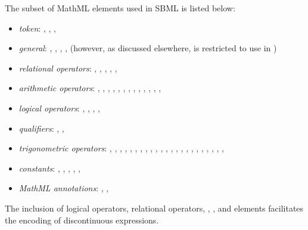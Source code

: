 The subset of MathML elements used in SBML is listed below:
\begin{itemize}\setlength{\parskip}{-0.1ex}

\item \emph{token}: , , ,
  
\item \emph{general}: , ,
  , ,  (however, as
  discussed elsewhere,  is restricted to use in
  \FunctionDefinition)

\item \emph{relational operators}: , ,
  , , , 

\item \emph{arithmetic operators}: , ,
  , , , ,
  , , , ,
  , , ,

\item \emph{logical operators}: , ,
  , , 

\item \emph{qualifiers}: , ,

\item \emph{trigonometric operators}: , ,
  , , , ,
  , , , ,
  , , , ,
  , , , ,
  , , ,
  , , 

\item \emph{constants}: , ,
  , , ,

\item \emph{MathML annotations}: ,
  , 

\end{itemize}

The inclusion of logical operators, relational operators,
, , and  elements
facilitates the encoding of discontinuous expressions.


